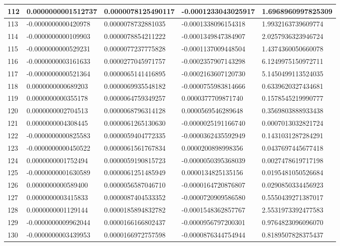 \begin{center}
\begin{longtable}{|p{0.5cm}|p{3.5cm}|p{3.5cm}|p{3.5cm}|p{3.5cm}|}
\hline
112  & 0.0000000001512737  & 0.0000078125490117  & -0.0001233043025917  & 1.6968960997825309\\
\hline
113  & -0.0000000000420978  & 0.0000078732881035  & -0.0001338096154318  & 1.9932163739609774\\
\hline
114  & -0.0000000000109903  & 0.0000078854211222  & -0.0001349847384907  & 2.0257936323946724\\
\hline
115  & -0.0000000000529231  & 0.0000077237775828  & -0.0001137009448504  & 1.4374360050660078\\
\hline
116  & -0.0000000003161633  & 0.0000277045971757  & -0.0002357907143298  & 6.1249975150972711\\
\hline
117  & -0.0000000000521364  & 0.0000065141416895  & -0.0002163607120730  & 5.1450499113524035\\
\hline
118  & 0.0000000000689203  & 0.0000069935548182  & -0.0000755983814666  & 0.6339620327434681\\
\hline
119  & 0.0000000000355178  & 0.0000064759349257  & 0.0000377709871740  & 0.1578545219990777\\
\hline
120  & 0.0000000002704513  & 0.0000068796314128  & 0.0000569546289648  & 0.3569803888933438\\
\hline
121  & 0.0000000004308445  & 0.0000061265130630  & -0.0000025191166740  & 0.0007013032821724\\
\hline
122  & -0.0000000000825583  & 0.0000059404772335  & -0.0000362435592949  & 0.1431031287284291\\
\hline
123  & -0.0000000000450522  & 0.0000061561767834  & 0.0000200898998356  & 0.0437697445677418\\
\hline
124  & 0.0000000001752494  & 0.0000059190815723  & -0.0000050395368039  & 0.0027478619717198\\
\hline
125  & -0.0000000001630589  & 0.0000061251485949  & 0.0000134825135156  & 0.0195481050526684\\
\hline
126  & 0.0000000000589400  & 0.0000056587046710  & -0.0000164720876807  & 0.0290850334456923\\
\hline
127  & 0.0000000003415833  & 0.0000087404533352  & -0.0000720909586580  & 0.5550439271387017\\
\hline
128  & 0.0000000001129144  & 0.0000185894832782  & -0.0001548362857767  & 2.5531973392477583\\
\hline
129  & -0.0000000009962044  & 0.0000166166802437  & -0.0000956797200301  & 0.9764823096096070\\
\hline
130  & -0.0000000003439953  & 0.0000166972757598  & -0.0000876344754944  & 0.8189507828375437\\

\end{longtable}
\end{center}
